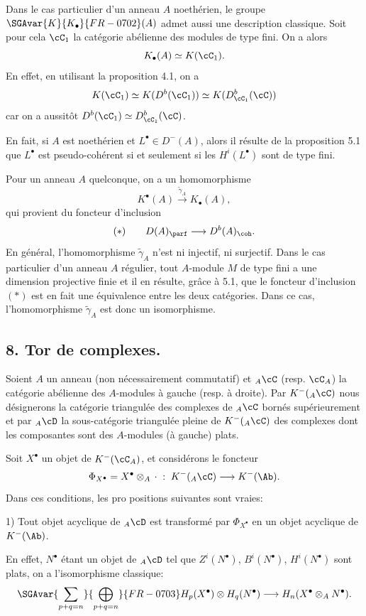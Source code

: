 Dans le cas particulier d'un anneau $A$ noethérien, le groupe $\SGAvar{K}{K_\bullet}{FR-0702}(A)$ admet aussi une description classique. Soit pour cela $\cC_1$ la catégorie abélienne des modules de type fini. On a alors
\[
K_\bullet(A)\simeq K(\cC_1).
\]
En effet, en utilisant la proposition 4.1, on a
\[
K(\cC_1)\simeq K(D^b(\cC_1))\simeq K(D^b_{\cC_1}(\cC))
\]
car on a
aussitôt $D^b(\cC_1)\simeq D^b_{\cC_1}(\cC)$.

En fait, si $A$ est noethérien et $L^\bullet\in D^-(A)$, alors il résulte de la proposition 5.1 que $L^\bullet$ est pseudo-cohérent si et seulement si les $H^i(L^\bullet)$ sont de type fini.

Pour un anneau $A$ quelconque, on a un homomorphisme
\[
K^{\bullet}(A)\xrightarrow{\widetilde\gamma_A}K_\bullet(A),
\]
qui provient du foncteur d'inclusion
\[
(*)\qquad D(A)_{\parf}\longrightarrow D^b(A)_{\coh}.
\]
En général, l'homomorphisme $\widetilde\gamma_A$ n'est ni injectif, ni surjectif. Dans le cas particulier d'un anneau $A$ régulier, tout $A$-module $M$ de type fini a une dimension projective finie et il en résulte, grâce à 5.1, que le foncteur d'inclusion $(*)$ est en fait une équivalence entre les deux catégories. Dans ce cas, l'homomorphisme $\widetilde\gamma_A$ est donc un isomorphisme.

\subsection*{8. Tor de complexes.}

Soient $A$ un anneau (non nécessairement commutatif) et ${}_A\cC$ (resp. $\cC_A$) la catégorie abélienne des $A$-modules à gauche (resp. à droite). Par $K^-({}_A\cC)$ nous désignerons la catégorie triangulée des complexes de ${}_A\cC$ bornés supérieurement et par ${}_A\cD$ la sous-catégorie triangulée pleine de $K^-({}_A\cC)$ des complexes dont les composantes sont des $A$-modules (à gauche) plats.

Soit $X^\bullet$ un objet de $K^-(\cC_A)$, et considérons le foncteur
\[
\Phi_{X^\bullet}=X^\bullet\otimes_A\,\cdot\;:\;K^-({}_A\cC)\longrightarrow K^-(\Ab).
\]
Dans ces conditions, les
pro%
positions suivantes sont vraies:

1) Tout objet acyclique de ${}_A\cD$ est transformé par $\Phi_{X^\bullet}$ en un objet acyclique de $K^-(\Ab)$.

En effet, $N^\bullet$ étant un objet de ${}_A\cD$ tel que $Z^i(N^\bullet)$, $B^i(N^\bullet)$, $H^i(N^\bullet)$ sont plats, on a l'isomorphisme classique:
\[
\SGAvar{\sum_{p+q=n}}{\bigoplus_{p+q=n}}{FR-0703}H_p(X^\bullet)\otimes H_q(N^\bullet)
\longrightarrow H_n(X^\bullet\otimes_A N^\bullet).
\]


